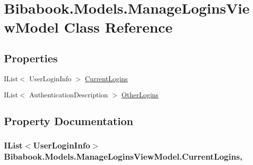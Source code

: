 \hypertarget{class_bibabook_1_1_models_1_1_manage_logins_view_model}{}\section{Bibabook.\+Models.\+Manage\+Logins\+View\+Model Class Reference}
\label{class_bibabook_1_1_models_1_1_manage_logins_view_model}
\subsection*{Properties}
\begin{DoxyCompactItemize}
\item 
I\+List$<$ User\+Login\+Info $>$ \hyperlink{class_bibabook_1_1_models_1_1_manage_logins_view_model_a6fe90a7fe0b5c71dc329010c5f7f6d96}{Current\+Logins}
\item 
I\+List$<$ Authentication\+Description $>$ \hyperlink{class_bibabook_1_1_models_1_1_manage_logins_view_model_a8ba2724ac7030943133521039f0d5e3f}{Other\+Logins}
\end{DoxyCompactItemize}


\subsection{Property Documentation}
\hypertarget{class_bibabook_1_1_models_1_1_manage_logins_view_model_a6fe90a7fe0b5c71dc329010c5f7f6d96}{}
\subsubsection[{Current\+Logins}]{\setlength{\rightskip}{0pt plus 5cm}I\+List$<$User\+Login\+Info$>$ Bibabook.\+Models.\+Manage\+Logins\+View\+Model.\+Current\+Logins\hspace{0.3cm}{\ttfamily [get]}, {\ttfamily [set]}}\label{class_bibabook_1_1_models_1_1_manage_logins_view_model_a6fe90a7fe0b5c71dc329010c5f7f6d96}
\hypertarget{class_bibabook_1_1_models_1_1_manage_logins_view_model_a8ba2724ac7030943133521039f0d5e3f}{}
